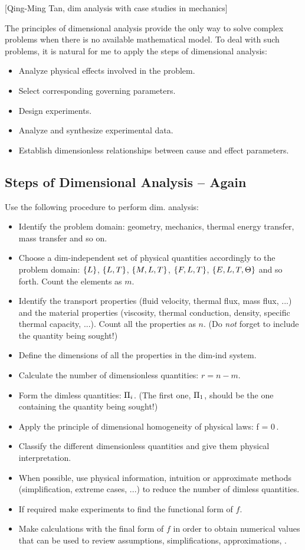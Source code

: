 [Qing-Ming Tan, dim analysis with case studies in mechanics]

The principles of dimensional analysis provide the only way to solve complex problems when there is no available mathematical model. To deal with such problems, it is natural for me to apply the steps of dimensional analysis:
\begin{itemize}
\item Analyze physical effects involved in the problem. 
\item Select corresponding governing parameters.
\item Design experiments.
\item Analyze and synthesize experimental data.
\item Establish dimensionless relationships between cause and effect parameters.
\end{itemize}


\subsection{Steps of Dimensional Analysis -- Again}
Use the following procedure to perform dim. analysis:
\begin{itemize}
\item Identify the problem domain: geometry, mechanics, thermal energy transfer, mass transfer and so on.
%
\item Choose a dim-independent set of physical quantities accordingly to the problem domain: $\left\lbrace{L}\right\rbrace$, $\left\lbrace{L,T}\right\rbrace$, $\left\lbrace{M,L,T}\right\rbrace$, $\left\lbrace{F,L,T}\right\rbrace$, $\left\lbrace{E,L,T,\Theta}\right\rbrace$ and so forth. Count the elements as $m$.
%
\item Identify the transport properties (fluid velocity, thermal flux, mass flux, ...) and the material properties (viscosity, thermal conduction, density, specific thermal capacity, ...). Count all the properties as $n$. (Do \emph{not} forget to include the quantity being sought!)
%
\item Define the dimensions of all the properties in the dim-ind system.
%
\item Calculate the number of dimensionless quantities: $r = n - m$.
%
\item Form the dimless quantities: $\Pi_i$. (The first one, $\Pi_1$, should be the one containing the quantity being sought!)
%
\item Apply the principle of dimensional homogeneity of physical laws:
\beq
f = 0\,.
\eeq
%
\item Classify the different dimensionless quantities and give them physical interpretation.
%
\item When possible, use physical information, intuition or approximate methods (simplification, extreme cases, ...) to reduce the number of dimless quantities.
%
\item If required make experiments to find the functional form of $f$.
%
\item Make calculations with the final form of $f$ in order to obtain numerical values that can be used to review assumptions, simplifications, approximations, \etc.
\end{itemize}


